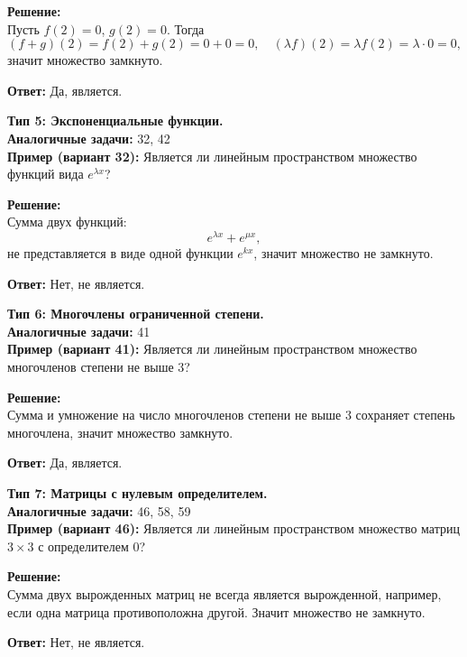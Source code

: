\documentclass[a4paper,12pt]{article}
\begin{document}
\textbf{Решение:}\\
Пусть \(f(2)=0\), \(g(2)=0\). Тогда
\[
(f+g)(2)=f(2)+g(2)=0+0=0,\quad (\lambda f)(2)=\lambda f(2)=\lambda\cdot 0=0,
\]
значит множество замкнуто.

\textbf{Ответ:} Да, является.

\bigskip
\textbf{Тип 5: Экспоненциальные функции.}\\
\textbf{Аналогичные задачи:} 32, 42\\
\textbf{Пример (вариант 32):} Является ли линейным пространством множество функций вида \( e^{\lambda x} \)?

\textbf{Решение:}\\
Сумма двух функций:
\[
e^{\lambda x}+e^{\mu x},
\]
не представляется в виде одной функции \( e^{k x} \), значит множество не замкнуто.

\textbf{Ответ:} Нет, не является.

\bigskip
\textbf{Тип 6: Многочлены ограниченной степени.}\\
\textbf{Аналогичные задачи:} 41\\
\textbf{Пример (вариант 41):} Является ли линейным пространством множество многочленов степени не выше \(3\)?

\textbf{Решение:}\\
Сумма и умножение на число многочленов степени не выше 3 сохраняет степень многочлена, значит множество замкнуто.

\textbf{Ответ:} Да, является.

\bigskip
\textbf{Тип 7: Матрицы с нулевым определителем.}\\
\textbf{Аналогичные задачи:} 46, 58, 59\\
\textbf{Пример (вариант 46):} Является ли линейным пространством множество матриц \(3\times3\) с определителем \(0\)?

\textbf{Решение:}\\
Сумма двух вырожденных матриц не всегда является вырожденной, например, если одна матрица противоположна другой. Значит множество не замкнуто.

\textbf{Ответ:} Нет, не является.
\end{document}
